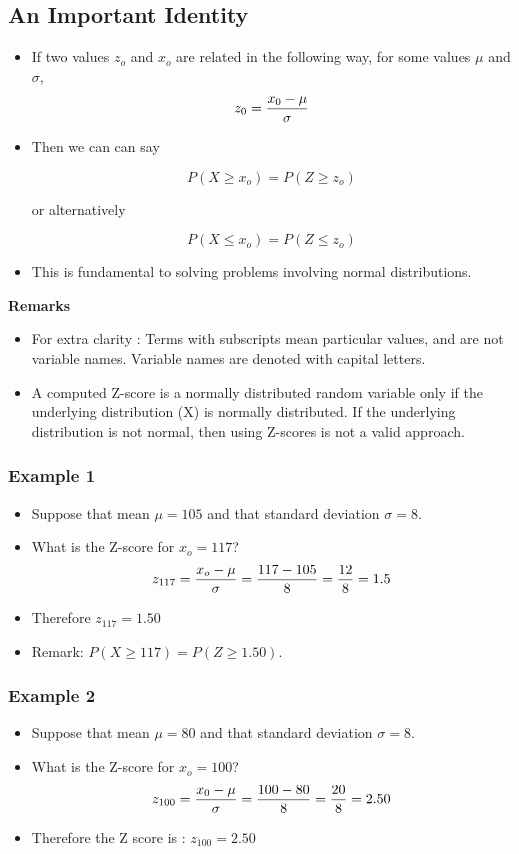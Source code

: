\documentclass[a4paper,12pt]{article}
\begin{document}
\subsection*{An Important Identity}
\begin{itemize}
\item If two values $z_o$ and $x_o$ are related in the following way, for some values $\mu$ and $\sigma$,
\[
z_{0} = {x_0 - \mu \over \sigma}
\]
\item Then we can can say

\[ P(X \geq x_o) = P(Z \geq z_o) \]

or alternatively

\[ P(X \leq x_o) = P(Z \leq z_o) \]

\item This is fundamental to solving problems involving normal distributions.
\end{itemize}


\noindent \textbf{Remarks}
\begin{itemize}
\item For extra clarity : Terms with subscripts mean particular values, and are not variable names. Variable names are denoted with capital letters.
\item A computed Z-score is a normally distributed random variable only if the underlying distribution (X) is normally distributed. If the underlying distribution is not normal, then using Z-scores is not a valid approach.
\end{itemize}
\subsubsection*{Example 1}
\begin{itemize}
\item Suppose that mean $\mu = 105 $ and that standard deviation $\sigma = 8$.
\item What is the Z-score for $x_o = 117$?
\[
z_{117} = {x_o - \mu \over \sigma} = {117 - 105 \over 8} = {12 \over 8} = 1.5
\]
\item Therefore $z_{117} = 1.50$
\item Remark: $P(X \geq 117) = P(Z \geq 1.50)$.
\end{itemize}

\subsubsection*{Example 2}

\begin{itemize}
\item Suppose that mean $\mu = 80 $ and that standard deviation $\sigma = 8$.
\item What is the Z-score for $x_o = 100$?
\[
z_{100} = {x_0 - \mu \over \sigma} = {100 - 80 \over 8} = {20 \over 8} = 2.50
\]
\item Therefore the Z score is : $z_{100} = 2.50$
\end{itemize}
\end{document}
